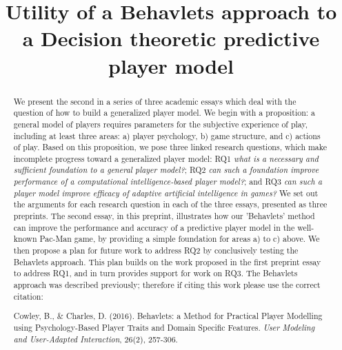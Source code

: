 \documentclass[conference]{IEEEtran}
\begin{document}
\title{Utility of a Behavlets approach to a Decision theoretic predictive player model}


\author{
\and
{}
}


\maketitle

\begin{abstract}
We present the second in a series of three academic essays which deal with the question of how to build a generalized player model. We begin with a proposition: a general model of players requires parameters for the subjective experience of play, including at least three areas: \textsf{a}) player psychology, \textsf{b}) game structure, and \textsf{c}) actions of play. Based on this proposition, we pose three linked research questions, which make incomplete progress toward a generalized player model:
\textsf{RQ1} \textit{what is a necessary and sufficient foundation to a general player model?};
\textsf{RQ2} \textit{can such a foundation improve performance of a computational intelligence-based player model?}; and
\textsf{RQ3} \textit{can such a player model improve efficacy of adaptive artificial intelligence in games?}
We set out the arguments for each research question in each of the three essays, presented as three preprints.
The second essay, in this preprint, illustrates how our 'Behavlets' method can improve the performance and accuracy of a predictive player model in the well-known Pac-Man game, by providing a simple foundation for areas \textsf{a}) to \textsf{c}) above.
We then propose a plan for future work to address \textsf{RQ2} by conclusively testing the Behavlets approach. This plan builds on the work proposed in the first preprint essay to address \textsf{RQ1}, and in turn provides support for work on \textsf{RQ3}.
The Behavlets approach was described previously; therefore if citing this work please use the correct citation:

Cowley, B., \& Charles, D. (2016). Behavlets: a Method for Practical Player Modelling using Psychology-Based Player Traits and Domain Specific Features. \textit{User Modeling and User-Adapted Interaction}, 26(2), 257-306.
\end{abstract}
\end{document}
